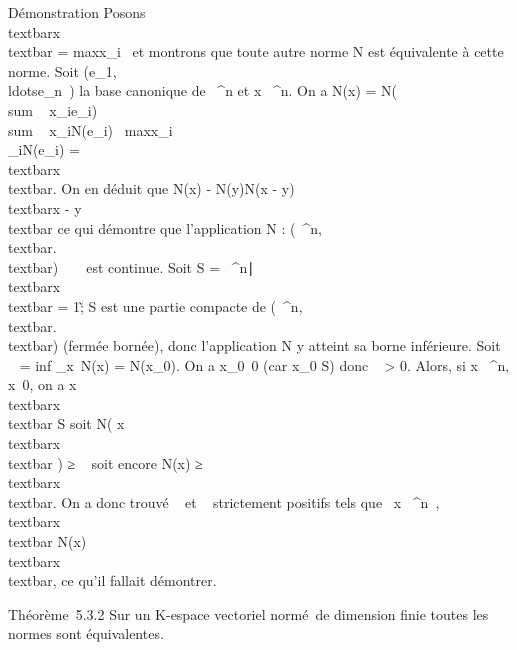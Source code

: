 \documentclass[]{article}
\begin{document}
Démonstration Posons
\\textbar{}x\\textbar{}
= max\textbar{}x\_i~\textbar{} et
montrons que toute autre norme N est équivalente à cette norme. Soit
(e\_1,\\ldotse\_n~)
la base canonique de ~^n et x \in {}~^n. On a N(x) =
N(\\sum ~
x\_ie\_i)
\leq\\sum ~
\textbar{}x\_i\textbar{}N(e\_i)
\leq\
max\textbar{}x\_i\textbar{}\\\sum
 \_iN(e\_i) =
\beta~\\textbar{}x\\textbar{}. On en déduit que
\textbar{}N(x) - N(y)\textbar{}\leq N(x - y) \leq \beta~\\textbar{}x
- y\\textbar{} ce qui démontre que l'application N :
(~^n,\\textbar{}.\\textbar{}) \rightarrow~
~ est continue. Soit S = \x \in
\mathbb{R}~^n∣\\textbar{}x\\textbar{}
= 1\~; S est une partie compacte de
(~^n,\\textbar{}.\\textbar{})
(fermée bornée), donc l'application N y atteint sa borne inférieure.
Soit \alpha~ = inf \_x\inS~N(x) =
N(x\_0). On a x\_0\neq~0 (car
x\_0 \in S) donc \alpha~ \textgreater{} 0. Alors, si x \in {}~^n,
x\neq~0, on a  x \over
\\textbar{}x\\textbar{} \in S soit N( x
\over
\\textbar{}x\\textbar{} ) ≥ \alpha~ soit
encore N(x) ≥ \alpha~\\textbar{}x\\textbar{}. On
a donc trouvé \alpha~ et \beta~ strictement positifs tels que
\forall~x \in {}~^n~,
\alpha~\\textbar{}x\\textbar{} \leq N(x) \leq
\beta~\\textbar{}x\\textbar{}, ce qu'il fallait
démontrer.

Théorème~5.3.2 Sur un K-espace vectoriel normé~de dimension finie toutes
les normes sont équivalentes.
\end{document}
